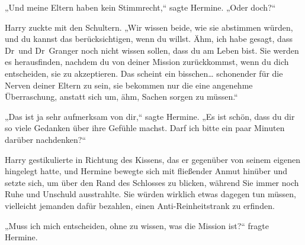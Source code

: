 „Und meine Eltern haben kein Stimmrecht,“ sagte Hermine. „Oder doch?“

Harry zuckte mit den Schultern. „Wir wissen beide, wie sie abstimmen würden, und du kannst das berücksichtigen, wenn du willst. Ähm, ich habe gesagt, dass Dr~und Dr~Granger noch nicht wissen sollen, dass du am Leben bist. Sie werden es herausfinden, nachdem du von deiner Mission zurückkommst, wenn du dich entscheiden, sie zu akzeptieren. Das scheint ein bisschen… schonender für die Nerven deiner Eltern zu sein, sie bekommen nur die eine angenehme Überraschung, anstatt sich um, ähm, Sachen sorgen zu müssen.“

„Das ist ja sehr aufmerksam von dir,“ sagte Hermine. „Es ist schön, dass du dir so viele Gedanken über ihre Gefühle machst. Darf ich bitte ein paar Minuten darüber nachdenken?“

Harry gestikulierte in Richtung des Kissens, das er gegenüber von seinem eigenen hingelegt hatte, und Hermine bewegte sich mit fließender Anmut hinüber und setzte sich, um über den Rand des Schlosses zu blicken, während Sie immer noch Ruhe und Unschuld ausstrahlte.
Sie würden wirklich etwas dagegen tun müssen, vielleicht jemanden dafür bezahlen, einen Anti-Reinheitstrank zu erfinden.

„Muss ich mich entscheiden, ohne zu wissen, was die Mission ist?“ fragte Hermine.

